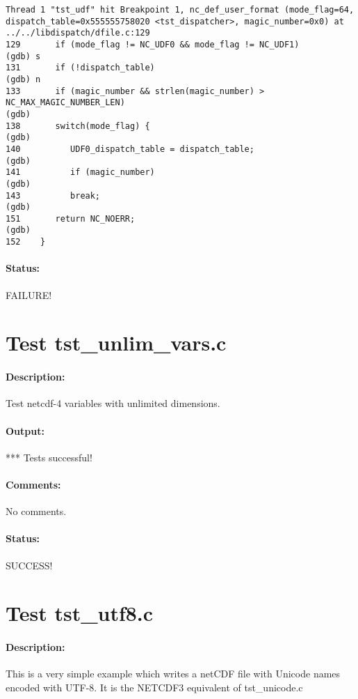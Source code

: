 \begin{verbatim}
Thread 1 "tst_udf" hit Breakpoint 1, nc_def_user_format (mode_flag=64, dispatch_table=0x555555758020 <tst_dispatcher>, magic_number=0x0) at ../../libdispatch/dfile.c:129
129       if (mode_flag != NC_UDF0 && mode_flag != NC_UDF1)
(gdb) s
131       if (!dispatch_table)
(gdb) n
133       if (magic_number && strlen(magic_number) > NC_MAX_MAGIC_NUMBER_LEN)
(gdb)
138       switch(mode_flag) {
(gdb)
140          UDF0_dispatch_table = dispatch_table;
(gdb)
141          if (magic_number)
(gdb)
143          break;
(gdb)
151       return NC_NOERR;
(gdb)
152    }
\end{verbatim}

\paragraph{Status:} FAILURE!

{\color{blue}{Help, Julian!}}

\section{Test tst\_unlim\_vars.c}

\paragraph{Description:} Test netcdf-4 variables with unlimited dimensions.

\paragraph{Output:} *** Tests successful!

\paragraph{Comments:} No comments.

\paragraph{Status:} SUCCESS!

\section{Test tst\_utf8.c}

\paragraph{Description:} This is a very simple example which writes a netCDF file with Unicode names encoded with UTF-8. It is the NETCDF3 equivalent of tst\_unicode.c

